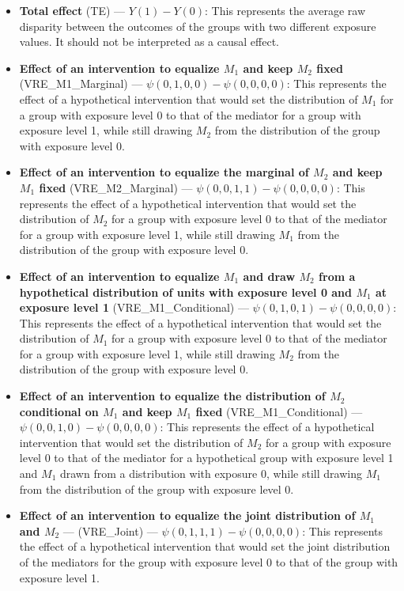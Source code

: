 \documentclass[12pt]{article} %
\numberwithin{equation}{section} %
\begin{document}
\begin{itemize}
\item \textbf{Total effect} (TE) --- $Y(1) - Y(0)$: This represents the average raw disparity between the outcomes of the 
groups with two different exposure values. It should not be interpreted as a causal effect. 
\item \textbf{Effect of an intervention to equalize $M_{1}$ and keep $M_{2}$ fixed} 
(VRE\_M1\_Marginal) --- $\psi(0,1,0,0) - \psi(0,0,0,0)$: This represents the effect of a hypothetical intervention that would set the 
distribution of $M_{1}$ for a group with exposure level 0 to that of the mediator for a group with exposure 
level 1, while still drawing $M_{2}$ from the distribution of the group with exposure level 0.  
\item \textbf{Effect of an intervention to equalize the marginal of $M_{2}$ and keep $M_{1}$ fixed} 
(VRE\_M2\_Marginal) --- $\psi(0,0,1,1) - \psi(0,0,0,0)$: This represents the effect of a hypothetical intervention that would set the 
distribution of $M_{2}$ for a group with exposure level 0 to that of the mediator for a group with exposure 
level 1, while still drawing $M_{1}$ from the distribution of the group with exposure level 0.  
\item \textbf{Effect of an intervention to equalize $M_{1}$ and draw $M_{2}$ 
from a hypothetical distribution of units with exposure level 0 and $M_{1}$ at exposure level 1}
(VRE\_M1\_Conditional) --- $\psi(0,1,0,1) - \psi(0,0,0,0)$: This represents the effect of a hypothetical intervention that would set the 
distribution of $M_{1}$ for a group with exposure level 0 to that of the mediator for a group with exposure 
level 1, while still drawing $M_{2}$ from the distribution of the group with exposure level 0.  
\item \textbf{Effect of an intervention to equalize the distribution of $M_{2}$ conditional on $M_{1}$ and keep $M_{1}$ fixed} 
(VRE\_M1\_Conditional) --- $\psi(0,0,1,0) - \psi(0,0,0,0)$: This represents the effect of a hypothetical intervention that would set the 
distribution of $M_{2}$ for a group with exposure level 0 to that of the mediator for a hypothetical group with exposure 
level 1 and $M_{1}$ drawn from a distribution with exposure 0,
while still drawing $M_{1}$ from the distribution of the group with exposure level 0.
\item \textbf{Effect of an intervention to equalize the joint distribution of $M_{1}$ and $M_{2}$} --- 
(VRE\_Joint) --- $\psi(0,1,1,1) - \psi(0,0,0,0)$: This represents the effect of a hypothetical intervention that would set the 
joint distribution of the mediators for the group with exposure level 0 to that of the group with exposure level 1. 
\end{itemize}
\end{document}
